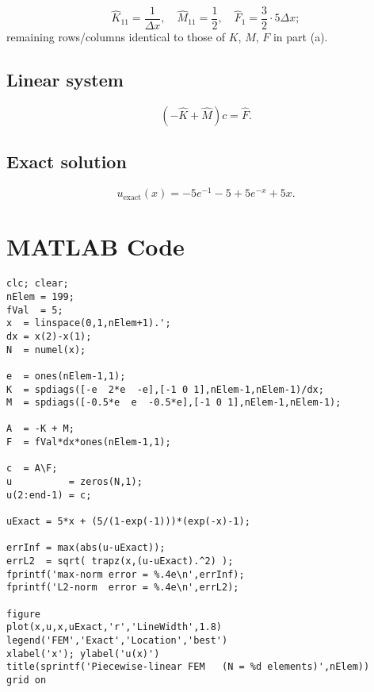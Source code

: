\documentclass{article}
\begin{document}
\[
\widehat K_{11}=\frac1{\Delta x},\quad
\widehat M_{11}=\frac12,\quad
\widehat F_1=\frac32\cdot5\Delta x;
\]
remaining rows/columns identical to those of $K$, $M$, $F$ in part (a).

\subsection*{Linear system}

\[
(-\widehat K+\widehat M)c=\widehat F.
\]

\subsection*{Exact solution}

\[
u_{\mathrm{exact}}(x)= -5e^{-1}-5+5e^{-x}+5x.
\]

\newpage

\section*{MATLAB Code}


\begin{tcolorbox}[title=Piecewise‐linear FEM MATLAB Code]
\begin{lstlisting}
clc; clear;
nElem = 199;                 
fVal  = 5;                   
x  = linspace(0,1,nElem+1).';
dx = x(2)-x(1);
N  = numel(x);

e  = ones(nElem-1,1);
K  = spdiags([-e  2*e  -e],[-1 0 1],nElem-1,nElem-1)/dx;
M  = spdiags([-0.5*e  e  -0.5*e],[-1 0 1],nElem-1,nElem-1);

A  = -K + M;                       
F  = fVal*dx*ones(nElem-1,1);      

c  = A\F;                          
u          = zeros(N,1);           
u(2:end-1) = c;

uExact = 5*x + (5/(1-exp(-1)))*(exp(-x)-1);

errInf = max(abs(u-uExact));
errL2  = sqrt( trapz(x,(u-uExact).^2) );
fprintf('max-norm error = %.4e\n',errInf);
fprintf('L2-norm  error = %.4e\n',errL2);

figure
plot(x,u,x,uExact,'r','LineWidth',1.8)
legend('FEM','Exact','Location','best')
xlabel('x'); ylabel('u(x)')
title(sprintf('Piecewise-linear FEM   (N = %d elements)',nElem))
grid on
\end{lstlisting}
\end{tcolorbox}
\end{document}
